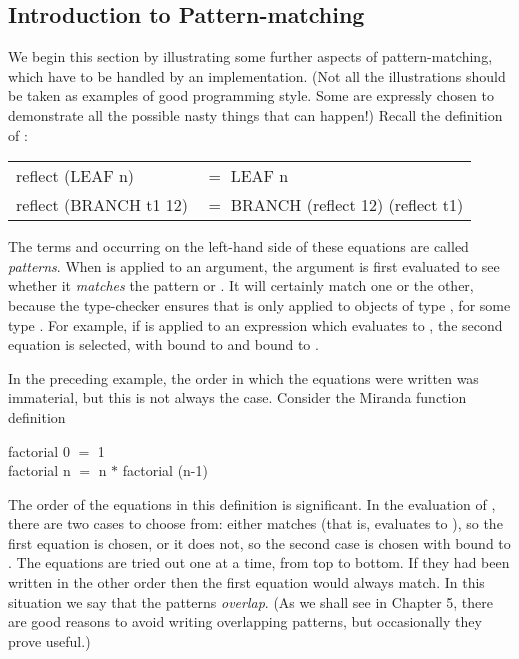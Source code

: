 \subsection{Introduction to Pattern-matching}
We begin this section by illustrating some further aspects of pattern-matching, which have to be handled by an implementation. (Not all the illustrations should be taken as examples of good programming style. Some are expressly chosen to demonstrate all the possible nasty things that can happen!)  Recall the definition of :
\begin{mlcoded}
    \begin{tabular}{ll}
    reflect (LEAF n) &$=$ LEAF n\\
    reflect (BRANCH t1 12) &$=$ BRANCH (reflect 12) (reflect t1)
    \end{tabular}
\end{mlcoded}

The terms  and  occurring on the left-hand side of these equations are called \textit{patterns}. When  is applied to an argument, the argument is first evaluated to see whether it \textit{matches} the pattern  or . It will certainly match one or the other, because the type-checker ensures that  is only applied to objects of type , for some type \ml{$*$}. For example, if  is applied to an expression which evaluates to , the second equation is selected, with  bound to  and  bound to .

In the preceding example, the order in which the equations were written was immaterial, but this is not always the case. Consider the Miranda function definition
\begin{mlcoded}
    factorial 0 $=$ 1\\
    factorial n $=$ n $*$ factorial (n-1)
\end{mlcoded}

The order of the equations in this definition is significant. In the evaluation of , there are two cases to choose from: either  matches  (that is,  evaluates to ), so the first equation is chosen, or it does not, so the second case is chosen with  bound to . The equations are tried out one at a time, from top to bottom. If they had been written in the other order then the first equation would always match. In this situation we say that the patterns \textit{overlap}. (As we shall see in Chapter 5, there are good reasons to avoid writing overlapping patterns, but occasionally they prove useful.)

